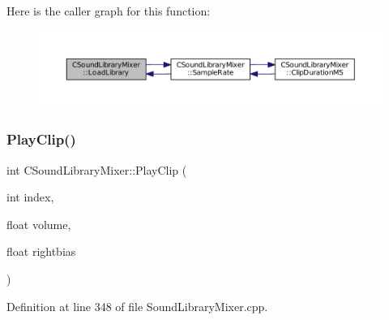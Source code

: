 Here is the caller graph for this function\+:\nopagebreak
\begin{figure}[H]
\begin{center}
\leavevmode
\includegraphics[width=350pt]{classCSoundLibraryMixer_a9753684f44863e3c7cc4d319370cda1d_icgraph}
\end{center}
\end{figure}
\hypertarget{classCSoundLibraryMixer_a9af6d9e3dacf63b07a7ad75e629bdc2f}{}\label{classCSoundLibraryMixer_a9af6d9e3dacf63b07a7ad75e629bdc2f} 
\subsubsection{\texorpdfstring{Play\+Clip()}{PlayClip()}}
{\footnotesize\ttfamily int C\+Sound\+Library\+Mixer\+::\+Play\+Clip (\begin{DoxyParamCaption}\item[{int}]{index,  }\item[{float}]{volume,  }\item[{float}]{rightbias }\end{DoxyParamCaption})}



Definition at line 348 of file Sound\+Library\+Mixer.\+cpp.



